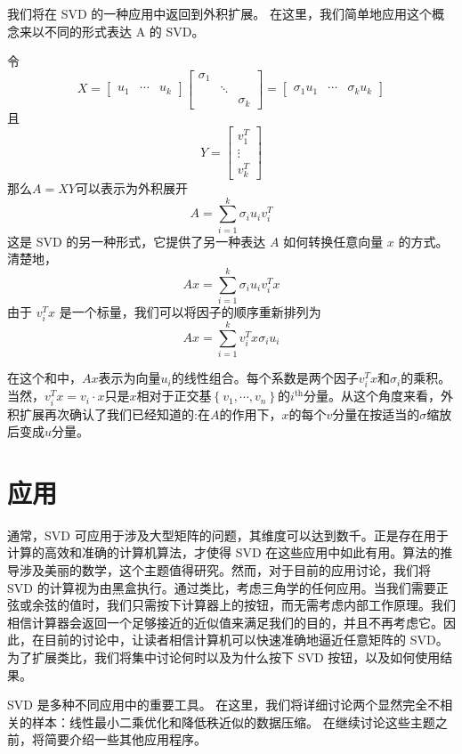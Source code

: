 \documentclass[11pt,a4paper,twoside]{article}
\begin{document}
\begin{CJK}{UTF8}{gbsn}
我们将在 SVD 的一种应用中返回到外积扩展。 在这里，我们简单地应用这个概念来以不同的形式表达 A 的 SVD。

令
$$
X=\left[\begin{array}{lll}
u_{1} & \cdots & u_{k}
\end{array}\right]\left[\begin{array}{ccc}
\sigma_{1} & & \\
& \ddots & \\
& & \sigma_{k}
\end{array}\right]=\left[\begin{array}{ccc}
\sigma_{1} u_{1} & \cdots & \sigma_{k} u_{k}
\end{array}\right]
$$
且
$$
Y=\left[\begin{array}{c}
v_{1}^{T} \\
\vdots \\
v_{k}^{T}
\end{array}\right]
$$
那么$A=X Y$可以表示为外积展开
$$
A=\sum_{i=1}^{k} \sigma_{i} u_{i} v_{i}^{T}
$$
这是 SVD 的另一种形式，它提供了另一种表达 $A$ 如何转换任意向量 $x$ 的方式。 清楚地，
$$
A x=\sum_{i=1}^{k} \sigma_{i} u_{i} v_{i}^{T} x
$$
由于 $v_{i}^{T} x$ 是一个标量，我们可以将因子的顺序重新排列为
$$
A x=\sum_{i=1}^{k} v_{i}^{T} x \sigma_{i} u_{i}
$$

在这个和中，$A x$表示为向量$u_{i}$的线性组合。每个系数是两个因子$v_{i}^{T} x$和$\sigma_{i}$的乘积。当然，$v_{i}^{T} x=v_{i} \cdot x$只是$x$相对于正交基$\left\{v_{1}, \cdots, v_{n}\right\}$的$i^{\text {th}}$分量。从这个角度来看，外积扩展再次确认了我们已经知道的:在$A$的作用下，$x$的每个$v$分量在按适当的$\sigma$缩放后变成$u$分量。

\section{应用}
通常，SVD 可应用于涉及大型矩阵的问题，其维度可以达到数千。正是存在用于计算的高效和准确的计算机算法，才使得 SVD 在这些应用中如此有用。算法的推导涉及美丽的数学，这个主题值得研究。然而，对于目前的应用讨论，我们将 SVD 的计算视为由黑盒执行。通过类比，考虑三角学的任何应用。当我们需要正弦或余弦的值时，我们只需按下计算器上的按钮，而无需考虑内部工作原理。我们相信计算器会返回一个足够接近的近似值来满足我们的目的，并且不再考虑它。因此，在目前的讨论中，让读者相信计算机可以快速准确地逼近任意矩阵的 SVD。为了扩展类比，我们将集中讨论何时以及为什么按下 SVD 按钮，以及如何使用结果。

SVD 是多种不同应用中的重要工具。 在这里，我们将详细讨论两个显然完全不相关的样本：线性最小二乘优化和降低秩近似的数据压缩。 在继续讨论这些主题之前，将简要介绍一些其他应用程序。


\end{CJK}
\end{document}
